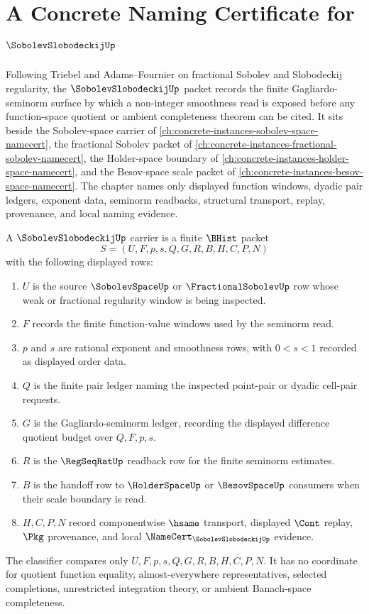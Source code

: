 \chapter{A Concrete Naming Certificate for $\SobolevSlobodeckijUp$}
\label{ch:concrete-instances-sobolev-slobodeckij-namecert}

Following Triebel and Adams--Fournier on fractional Sobolev and Slobodeckij regularity, the $\SobolevSlobodeckijUp$ packet records the finite Gagliardo-seminorm surface by which a non-integer smoothness read is exposed before any function-space quotient or ambient completeness theorem can be cited. It sits beside the Sobolev-space carrier of \autoref{ch:concrete-instances-sobolev-space-namecert}, the fractional Sobolev packet of \autoref{ch:concrete-instances-fractional-sobolev-namecert}, the Holder-space boundary of \autoref{ch:concrete-instances-holder-space-namecert}, and the Besov-space scale packet of \autoref{ch:concrete-instances-besov-space-namecert}. The chapter names only displayed function windows, dyadic pair ledgers, exponent data, seminorm readbacks, structural transport, replay, provenance, and local naming evidence.

\begin{definition}
\label{def:sobolev-slobodeckij-carrier}
A $\SobolevSlobodeckijUp$ carrier is a finite $\BHist$ packet
$$
S=(U,F,p,s,Q,G,R,B,H,C,P,N)
$$
with the following displayed rows:
\begin{enumerate}
\item $U$ is the source $\SobolevSpaceUp$ or $\FractionalSobolevUp$ row whose weak or fractional regularity window is being inspected.
\item $F$ records the finite function-value windows used by the seminorm read.
\item $p$ and $s$ are rational exponent and smoothness rows, with $0<s<1$ recorded as displayed order data.
\item $Q$ is the finite pair ledger naming the inspected point-pair or dyadic cell-pair requests.
\item $G$ is the Gagliardo-seminorm ledger, recording the displayed difference quotient budget over $Q,F,p,s$.
\item $R$ is the $\RegSeqRatUp$ readback row for the finite seminorm estimates.
\item $B$ is the handoff row to $\HolderSpaceUp$ or $\BesovSpaceUp$ consumers when their scale boundary is read.
\item $H,C,P,N$ record componentwise $\hsame$ transport, displayed $\Cont$ replay, $\Pkg$ provenance, and local $\NameCert_{\SobolevSlobodeckijUp}$ evidence.
\end{enumerate}
The classifier compares only $U,F,p,s,Q,G,R,B,H,C,P,N$. It has no coordinate for quotient function equality, almost-everywhere representatives, selected completions, unrestricted integration theory, or ambient Banach-space completeness.
\end{definition}

